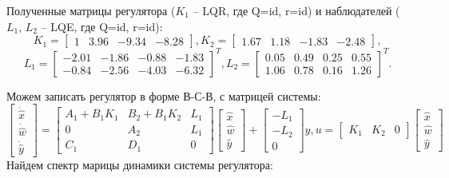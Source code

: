 Полученные матрицы регулятора ($K_1$ -- LQR, где Q=id, r=id) и наблюдателей ($L_1$, $L_2$ -- LQE, где Q=id, r=id):
\begin{equation*}
    K_1 = \begin{bmatrix}
        1 & 3.96 & -9.34 & -8.28
    \end{bmatrix},
    K_2 = \begin{bmatrix}
        1.67 & 1.18 & -1.83 & -2.48
    \end{bmatrix},
\end{equation*}
\begin{equation*}
    L_1 = \begin{bmatrix}
        -2.01 & -1.86 & -0.88 & -1.83 \\
        -0.84 & -2.56 & -4.03 & -6.32
    \end{bmatrix}^T,
    L_2 = \begin{bmatrix}
        0.05 & 0.49 & 0.25 & 0.55 \\
        1.06 & 0.78 & 0.16 & 1.26
    \end{bmatrix}^T.
\end{equation*}

Можем записать регулятор в форме В-С-В, с матрицей системы:
\begin{equation}
    \begin{bmatrix}
        \dot{\hat{x}} \\ \dot{\hat{w}} \\ \dot{\hat{y}}
    \end{bmatrix} =
    \begin{bmatrix}
        A_1 + B_1K_1 & B_2 + B_1K_2 & L_1 \\
        0 & A_2 & L_1 \\
        C_1 & D_1 & 0
    \end{bmatrix}
    \begin{bmatrix}
        {\hat{x}} \\ {\hat{w}} \\ {\hat{y}}
    \end{bmatrix} +
    \begin{bmatrix}
        -L_1 \\ -L_2 \\ 0
    \end{bmatrix}y, u = \begin{bmatrix}
        K_1 & K_2 & 0
    \end{bmatrix}\begin{bmatrix}
        {\hat{x}} \\ {\hat{w}} \\ {\hat{y}}
    \end{bmatrix}
\end{equation}
Найдем спектр марицы динамики системы регулятора: 

